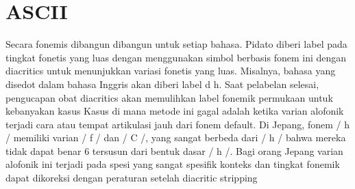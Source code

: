 \section{ASCII}
Secara fonemis dibangun dibangun untuk setiap bahasa.
Pidato diberi label pada tingkat fonetis yang luas dengan menggunakan simbol berbasis fonem ini dengan diacritics
untuk menunjukkan variasi fonetis yang luas. Misalnya, bahasa yang disedot dalam bahasa Inggris akan diberi label d h.
Saat pelabelan selesai, pengucapan obat diacritics akan memulihkan label fonemik permukaan
untuk kebanyakan kasus Kasus di mana metode ini gagal adalah ketika varian alofonik terjadi
cara atau tempat artikulasi jauh dari fonem default. Di Jepang, fonem / h /
memiliki varian / f / dan / C /, yang sangat berbeda dari / h / bahwa mereka tidak dapat benar
6
tersusun dari bentuk dasar / h /. Bagi orang Jepang varian alofonik ini terjadi pada spesi yang sangat spesifik
konteks dan tingkat fonemik dapat dikoreksi dengan peraturan setelah diacritic stripping
